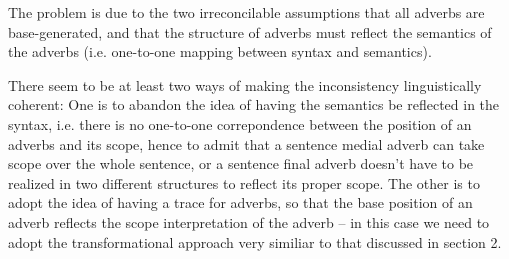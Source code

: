 The problem is due to the two irreconcilable assumptions that all
adverbs are base-generated, and that the structure of adverbs must
reflect the semantics of the adverbs (i.e. one-to-one mapping between
syntax and semantics).

There seem to be at least two ways of making the inconsistency
linguistically coherent: One is to abandon the idea of having the
semantics be reflected in the syntax, i.e. there is no one-to-one
correpondence between the position of an adverbs and its scope, hence
to admit that a sentence medial adverb can take scope over the whole
sentence, or a sentence final adverb doesn't have to be realized in
two different structures to reflect its proper scope. The other is to
adopt the idea of having a trace for adverbs, so that the base
position of an adverb reflects the scope interpretation of the adverb
-- in this case we need to adopt the transformational approach very
similiar to that discussed in section 2. 


